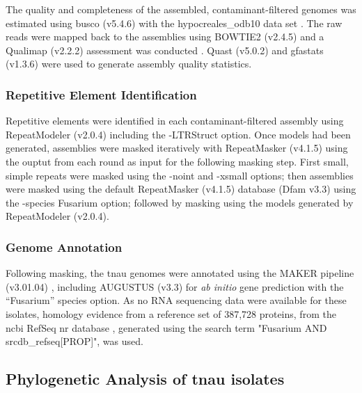 The quality and completeness of the assembled, contaminant-filtered genomes was estimated using \ac{busco} (v5.4.6) with the hypocreales\_odb10 data set \parencite{Manni2021}. The raw reads were mapped back to the assemblies using BOWTIE2 (v2.4.5) and a Qualimap (v2.2.2) assessment was conducted \parencite{Garcia-Alcalde2012}. Quast (v5.0.2) \parencite{Gurevich2013}  and gfastats (v1.3.6) \parencite{Formenti2022} were used to generate assembly quality statistics. 

\subsubsection{Repetitive Element Identification}

Repetitive elements were identified in each contaminant-filtered assembly using RepeatModeler (v2.0.4) \parencite{Flynn2020} including the -LTRStruct option. Once models had been generated, assemblies were masked iteratively with RepeatMasker (v4.1.5) \parencite{Smit2010} using the ouptut from each round  as input for the following masking step. First small, simple repeats were masked using the -noint and -xsmall options; then assemblies were masked using the default RepeatMasker (v4.1.5)  database (Dfam v3.3) \parencite{Storer2021} using the -species Fusarium option; followed by masking using the models generated by RepeatModeler (v2.0.4).

\subsubsection{Genome Annotation}
Following masking, the \ac{tnau} genomes were annotated using the MAKER pipeline (v3.01.04) \parencite{Holt2011}, including AUGUSTUS (v3.3) \parencite{Stanke2006} for \textit{ab initio} gene prediction with the “Fusarium” species option. As no RNA sequencing data were available for these isolates, homology evidence from a reference set of 387,728 proteins, from the \ac{ncbi} RefSeq nr database \parencite{Agarwala2016}, generated using the search term "Fusarium AND srcdb\_refseq[PROP]", was used. 

\subsection{Phylogenetic Analysis of \ac{tnau} isolates}\label{chap2:phylogeny}


